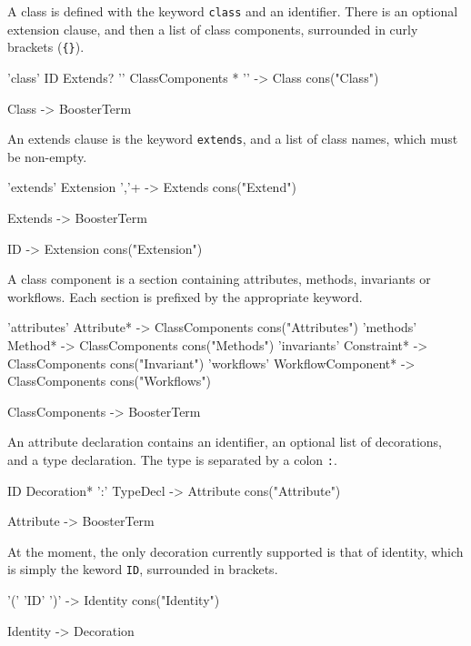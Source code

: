 A class is defined with the keyword \verb|class| and an identifier.
There is an optional extension clause, and then a list of class
components, surrounded in curly brackets (\verb|{}|).

\begin{code}
'class' ID Extends? '{' ClassComponents * '}' 
                                  -> Class  {cons("Class")}

Class -> BoosterTerm
\end{code}

An extends clause is the keyword \verb|extends|, and a list of class
names, which must be non-empty.

\begin{code}
'extends' {Extension ','}+ -> Extends {cons("Extend")}

Extends -> BoosterTerm

ID -> Extension {cons("Extension")}
\end{code}

A class component is a section containing attributes, methods,
invariants or workflows.  Each section is prefixed by the appropriate
keyword. 

\begin{code}
'attributes' Attribute*        -> ClassComponents {cons("Attributes")}
'methods' Method*              -> ClassComponents {cons("Methods")}
'invariants' Constraint*       -> ClassComponents {cons("Invariant")}
'workflows' WorkflowComponent* -> ClassComponents {cons("Workflows")}

ClassComponents -> BoosterTerm
\end{code}	


An attribute declaration contains an identifier, an optional list of
decorations, and a type declaration.  The type is separated by a colon
\verb|:|.

\begin{code}
ID Decoration* ':' TypeDecl -> Attribute {cons("Attribute")}

Attribute -> BoosterTerm
\end{code}

At the moment, the only decoration currently supported is that of
identity, which is simply the keword \verb|ID|, surrounded in
brackets.

\begin{code}
'(' 'ID' ')' -> Identity {cons("Identity")}

Identity -> Decoration
\end{code}

